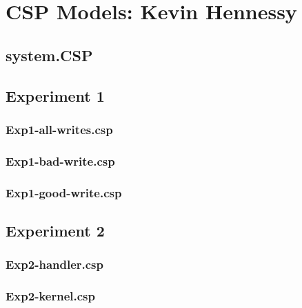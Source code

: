 \section{CSP Models: Kevin Hennessy}

\subsection{system.CSP}


\newpage
\subsection{Experiment 1}

\subsubsection{Exp1-all-writes.csp}


\newpage
\subsubsection{Exp1-bad-write.csp}


\newpage
\subsubsection{Exp1-good-write.csp}


\newpage
\subsection{Experiment 2}

\subsubsection{Exp2-handler.csp}


\newpage
\subsubsection{Exp2-kernel.csp}


